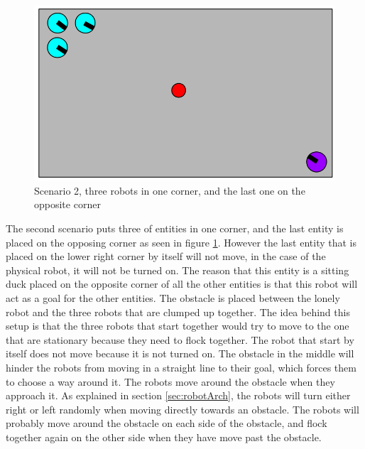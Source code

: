 \begin{figure}[h]
\begin{center}
\includegraphics[width=0.8\linewidth]{figs/scenario1}
\end{center}
\caption[scenario 2]{Scenario 2, three robots in one corner, and the last one on the opposite corner}
\label{fig:scenario1}
\end{figure}

The second scenario puts three of entities in one corner, and the last entity is placed on the opposing corner as seen in figure \ref{fig:scenario1}. However the last entity that is placed on the lower right corner by itself will not move, in the case of the physical robot, it will not be turned on. The reason that this entity is a sitting duck placed on the opposite corner of all the other entities is that this robot will act as a goal for the other entities. The obstacle is placed between the lonely robot and the three robots that are clumped up together. The idea behind this setup is that the three robots that start together would try to move to the one that are stationary because they need to flock together. The robot that start by itself does not move because it is not turned on.
The obstacle in the middle will hinder the robots from moving in a straight line to their goal, which forces them to choose a way around it. The robots move around the obstacle when they approach it. As explained in section \ref{sec:robotArch}, the robots will turn either right or left randomly when moving directly towards an obstacle. The robots will probably move around the obstacle on each side of the obstacle, and flock together again on the other side when they have move past the obstacle.

